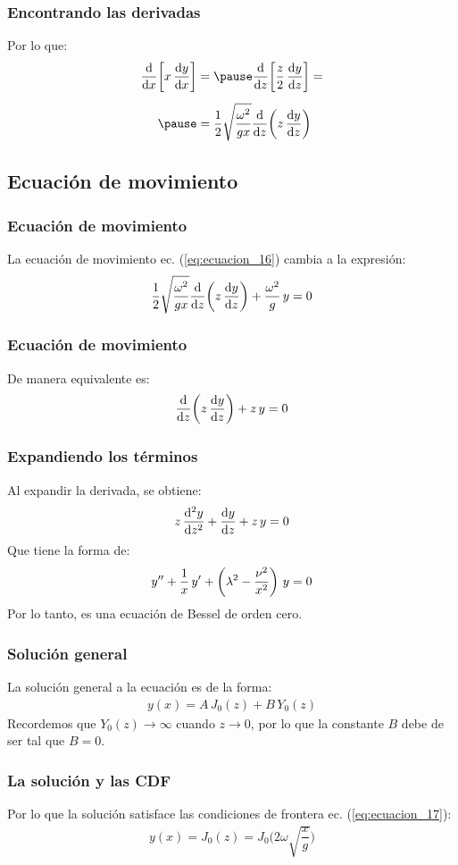 \documentclass[12pt]{beamer}
\begin{document}
\begin{frame}
\frametitle{Encontrando las derivadas}
Por lo que:
\pause
\begin{eqnarray}
\begin{aligned}[b]
\dv{x} \bigg[x \, \dv{y}{x} \bigg] &= \pause \dv{z} \bigg[ \dfrac{z}{2} \, \dv{y}{z} \bigg] = \\[0.5em] \pause
&= \dfrac{1}{2} \sqrt{\dfrac{\omega^{2}}{g x}} \dv{z} \bigg( z \, \dv{y}{z} \bigg)
\end{aligned}
\label{eq:ecuacion_20}
\end{eqnarray}
\end{frame}

\subsection{Ecuación de movimiento}

\begin{frame}
\frametitle{Ecuación de movimiento}
La ecuación de movimiento ec. (\ref{eq:ecuacion_16}) cambia a la expresión:
\pause
\begin{align}
\dfrac{1}{2} \sqrt{\dfrac{\omega^{2}}{g x}} \dv{z} \bigg( z \, \dv{y}{z} \bigg) + \dfrac{\omega^{2}}{g} \, y = 0
\label{eq:ecuacion_21}
\end{align}
\end{frame}
\begin{frame}
\frametitle{Ecuación de movimiento}
De manera equivalente es:
\pause
\begin{align}
\dv{z} \bigg( z \, \dv{y}{z} \bigg) + z \, y = 0
\label{eq:ecuacion_22}
\end{align}
\end{frame}
\begin{frame}
\frametitle{Expandiendo los términos}
Al expandir la derivada, se obtiene:
\pause
\begin{align}
z \, \dv[2]{y}{z} + \dv{y}{z} + z \, y = 0
\label{eq:ecuacion_23}
\end{align}
\pause
Que tiene la forma de:
\begin{align*}
{y}^{\prime \prime} + \dfrac{1}{x} \, {y}^{\prime} + \left( \lambda^{2} - \dfrac{\nu^{2}}{x^{2}} \right) \, y = 0
\end{align*}
\pause
Por lo tanto, es una ecuación de Bessel de orden cero.
\end{frame}
\begin{frame}
\frametitle{Solución general}
La solución general a la ecuación es de la forma:
\pause
\begin{align*}
y (x) = A \, J_{0} (z) + B \, Y_{0} (z)
\end{align*}
\pause
Recordemos que $Y_{0} (z) \to \infty$ cuando $z \to 0$, \pause por lo que la constante $B$ debe de ser tal que $B = 0$.
\end{frame}
\begin{frame}
\frametitle{La solución y las CDF}
Por lo que la solución satisface las condiciones de frontera ec. (\ref{eq:ecuacion_17}):
\pause
\begin{align}
y (x) = J_{0} (z) = J_{0} \bigg( 2 \omega \sqrt{\dfrac{x}{g}} \bigg)
\label{eq:ecuacion_24}
\end{align}
\end{frame}
\end{document}

